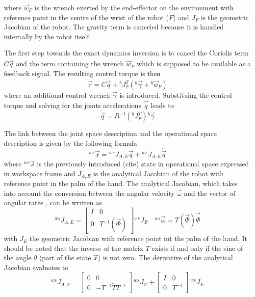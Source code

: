 where $\vec{w}_{F}$ is the wrench exerted by the end-effector on the environment with reference point in the centre
of the wrist of the robot ($F$) and $J_{F}$ is the geometric Jacobian of the robot.
The gravity term is canceled because it is handled internally by the robot itself.
\par
The first step towards the exact dynamics inversion is to cancel the Coriolis term
$C \dot{\vec{q}}$ and the term containing the wrench $\vec{w}_{F}$ which is supposed to
be available as a feedback signal. The resulting control torque is then
\begin{equation*}
  \vec{\tau} = C \dot{\vec{q}} + {}^{b}J^{T}_{F} ({}^b\vec{\gamma} + {}^b\vec{w}_{F})
\end{equation*}
where an additional control wrench $\vec{\gamma}$ is introduced.
Substituing the control torque and solving for the joints accelerations $\vec{\ddot{q}}$
leads to
\begin{equation}\label{eq:qddot}
  \ddot{\vec{q}} = B^{-1} ({}^{b}J^{T}_{F}) {}^b\vec{\gamma}
\end{equation}
\par
The link between the joint space description and the operational space description
is given by the following formula
\begin{equation}\label{eq:ws_a}
  {}^{ws} \ddot{\vec{x}} = {}^{ws} J_{A,E} \ddot{\vec{q}} + {}^{ws} \dot{J_{A,E}} \dot{\vec{q}}
\end{equation}
where ${}^{ws} \vec{x}$ is the previously introduced (cite) state in operational space expressed in workspace
frame and $J_{A,E}$ is the analytical Jacobian of the robot with reference point in the palm of the hand.
The analytical Jacobian, which takes into account the conversion between the angular velocity $\vec{\omega}$
and the vector of angular rates \vec{\dot{\Phi}}, can be written as
\begin{equation*}
  {}^{ws} J_{A,E} = 
  \begin{bmatrix}
    I & 0 \\
    0 & T^{-1}(\vec{\Phi})
  \end{bmatrix}
      {}^{ws} J_{E} \quad {}^{ws}\vec{\omega} = T(\vec{\Phi}) \vec{\dot{\Phi}}
\end{equation*}
with $J_E$ the geometric Jacobian with reference point int the palm of the hand. It should be noted
that the inverse of the matrix $T$ exists if and only if the sine of the angle $\theta$ (part of the state
$\vec{x}$) is not zero. The derivative of the analytical Jacobian evaluates to
\begin{equation*}
  {}^{ws} \dot{J_{A,E}} = 
  \begin{bmatrix}
    0 & 0 \\
    0 & -T^{-1} \dot{T} T^{-1}
  \end{bmatrix}
      {}^{ws} J_{E} + 
      \begin{bmatrix}
        I & 0 \\
        0 & T^{-1}
      \end{bmatrix}
          {}^{ws} \dot{J}_{E}
\end{equation*}
